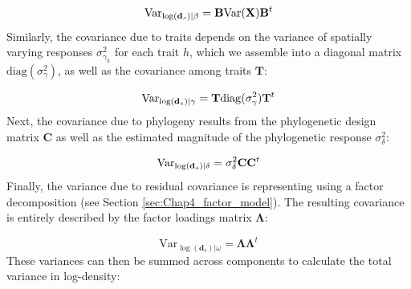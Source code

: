 \begin{equation}
  \mathrm{Var}_{\log(\mathbf{d}_{s})|\beta} = \mathbf{B} \mathrm{Var}( \mathbf{X} ) \mathbf{B}^t \\
\end{equation}
Similarly, the covariance due to traits depends on the variance of spatially varying responses \( \sigma_{\gamma_h}^2 \) for each trait \(h\), which we assemble into a diagonal matrix \( \mathrm{diag}( \sigma_{\gamma}^2 ) \), as well as the covariance among traits \( \mathbf{T} \):

\begin{equation}
  \mathrm{Var}_{\log(\mathbf{d}_{s})|\gamma} = \mathbf{T} \mathrm{diag}( \sigma_{\gamma}^2 ) \mathbf{T}^t \\
\end{equation}
Next, the covariance due to phylogeny results from the phylogenetic design matrix \( \mathbf{C} \) as well as the estimated magnitude of the phylogenetic response \( \sigma_{\delta}^2 \):

\begin{equation}
  \mathrm{Var}_{\log(\mathbf{d}_{s})|\delta} = \sigma_{\delta}^2 \mathbf{C} \mathbf{C}^t \\
\end{equation}
Finally, the variance due to residual covariance is representing using a factor decomposition (see Section \ref{sec:Chap4_factor_model}).  The resulting covariance is entirely described by the  factor loadings matrix \( \mathbf{\Lambda} \): 

\begin{equation}
  \mathrm{Var}_{\log(\mathbf{d}_{s})|\omega} = \mathbf{\Lambda} \mathbf{\Lambda}^t 
\end{equation}
These variances can then be summed across components to calculate the total variance in log-density:

